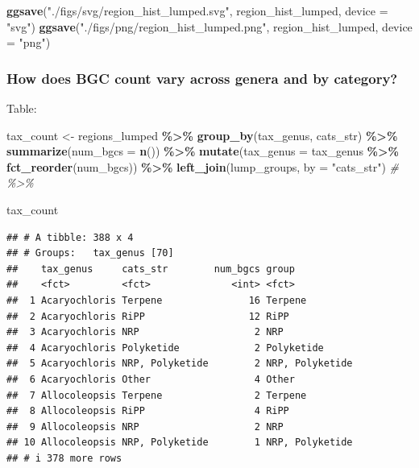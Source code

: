 \documentclass[
]{article}
\newenvironment{Shaded}{\begin{snugshade}}{\end{snugshade}}
\newcommand{\AttributeTok}[1]{\textcolor[rgb]{0.13,0.29,0.53}{#1}}
\newcommand{\CommentTok}[1]{\textcolor[rgb]{0.56,0.35,0.01}{\textit{#1}}}
\newcommand{\FunctionTok}[1]{\textcolor[rgb]{0.13,0.29,0.53}{\textbf{#1}}}
\newcommand{\NormalTok}[1]{#1}
\newcommand{\OtherTok}[1]{\textcolor[rgb]{0.56,0.35,0.01}{#1}}
\newcommand{\SpecialCharTok}[1]{\textcolor[rgb]{0.81,0.36,0.00}{\textbf{#1}}}
\newcommand{\StringTok}[1]{\textcolor[rgb]{0.31,0.60,0.02}{#1}}
\begin{document}
\begin{Shaded}
\begin{Highlighting}[]
\FunctionTok{ggsave}\NormalTok{(}\StringTok{"./figs/svg/region\_hist\_lumped.svg"}\NormalTok{, region\_hist\_lumped, }\AttributeTok{device =} \StringTok{"svg"}\NormalTok{)}
\FunctionTok{ggsave}\NormalTok{(}\StringTok{"./figs/png/region\_hist\_lumped.png"}\NormalTok{, region\_hist\_lumped, }\AttributeTok{device =} \StringTok{"png"}\NormalTok{)}
\end{Highlighting}
\end{Shaded}

\subsubsection{How does BGC count vary across genera and by
category?}\label{how-does-bgc-count-vary-across-genera-and-by-category}

Table:

\begin{Shaded}
\begin{Highlighting}[]
\NormalTok{tax\_count }\OtherTok{\textless{}{-}}\NormalTok{ regions\_lumped }\SpecialCharTok{\%\textgreater{}\%}
  \FunctionTok{group\_by}\NormalTok{(tax\_genus, cats\_str) }\SpecialCharTok{\%\textgreater{}\%}
  \FunctionTok{summarize}\NormalTok{(}\AttributeTok{num\_bgcs =} \FunctionTok{n}\NormalTok{()) }\SpecialCharTok{\%\textgreater{}\%}
  \FunctionTok{mutate}\NormalTok{(}\AttributeTok{tax\_genus =}\NormalTok{ tax\_genus }\SpecialCharTok{\%\textgreater{}\%} \FunctionTok{fct\_reorder}\NormalTok{(num\_bgcs)) }\SpecialCharTok{\%\textgreater{}\%}
  \FunctionTok{left\_join}\NormalTok{(lump\_groups, }\AttributeTok{by =} \StringTok{"cats\_str"}\NormalTok{) }\CommentTok{\# \%\textgreater{}\%}

\NormalTok{tax\_count}
\end{Highlighting}
\end{Shaded}

\begin{verbatim}
## # A tibble: 388 x 4
## # Groups:   tax_genus [70]
##    tax_genus     cats_str        num_bgcs group          
##    <fct>         <fct>              <int> <fct>          
##  1 Acaryochloris Terpene               16 Terpene        
##  2 Acaryochloris RiPP                  12 RiPP           
##  3 Acaryochloris NRP                    2 NRP            
##  4 Acaryochloris Polyketide             2 Polyketide     
##  5 Acaryochloris NRP, Polyketide        2 NRP, Polyketide
##  6 Acaryochloris Other                  4 Other          
##  7 Allocoleopsis Terpene                2 Terpene        
##  8 Allocoleopsis RiPP                   4 RiPP           
##  9 Allocoleopsis NRP                    2 NRP            
## 10 Allocoleopsis NRP, Polyketide        1 NRP, Polyketide
## # i 378 more rows
\end{verbatim}
\end{document}
